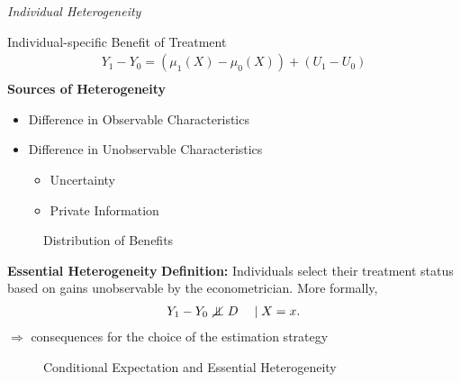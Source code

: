\begin{frame}\begin{center}
		\LARGE\textit{Individual Heterogeneity}
\end{center}\end{frame}
\begin{frame}
	Individual-specific Benefit of Treatment
	\begin{align*}
		Y_1 - Y_0 = (\mu_1(X) - \mu_0(X)) + (U_1 - U_0)\\
	\end{align*}
	\textbf{Sources of Heterogeneity}
	\begin{itemize}\setlength\itemsep{1em}
		\item Difference in Observable Characteristics
		\item Difference in Unobservable Characteristics\medskip
		\begin{itemize}\setlength\itemsep{1em}
			\item  Uncertainty
			\item Private Information
		\end{itemize}
	\end{itemize}
\end{frame}
\begin{frame}
	\begin{figure}\caption{Distribution of Benefits}
	\end{figure}
\end{frame}
\begin{frame}
	\textbf{Essential Heterogeneity}\vspace{0.5cm}	
	\textbf{Definition:} Individuals select their treatment status based on
	gains unobservable by the econometrician. More formally,	
	\begin{align*}
		Y_1 - Y_0 \notindep D\quad \mid X = x.
	\end{align*}	
	\(\Rightarrow\) consequences for the choice of the estimation strategy	
\end{frame}
\begin{frame}
	\begin{figure}\caption{Conditional Expectation and Essential Heterogeneity}
	\end{figure}
\end{frame}
